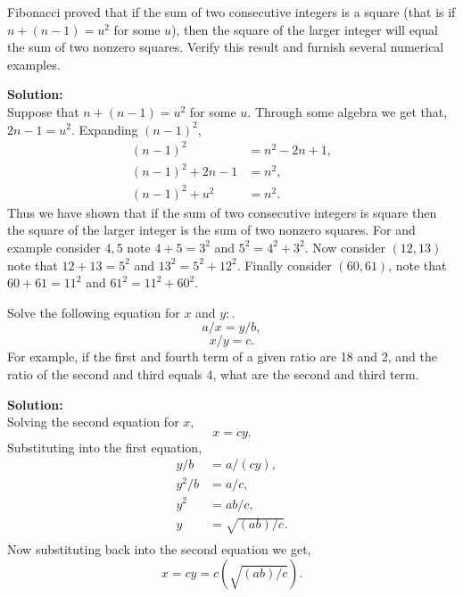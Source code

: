 \documentclass[12pt]{article}
\makeatletter
\theoremstyle{homework}
\newenvironment{exercise}[1]
{\def\@currentlabel{#1}\exercisecore}
{\endexercisecore}
\newcommand{\localhead}[1]{\par\smallskip\noindent\textbf{#1}\nobreak\\}%
\newcommand\solution{\localhead{Solution:}}
\makeatother
\begin{document}
\begin{exercise}{7} Fibonacci proved that if the sum of two consecutive integers is a square (that is if $n + (n-1) = u^2$ for some $u$), 
  then the square of the larger integer will equal the sum of two nonzero squares. Verify this 
  result and furnish several numerical examples.\\
  \solution Suppose that $n + (n-1) = u^2$ for some $u$. Through some algebra we get that, $2n - 1 = u^2$. Expanding $(n-1)^2$,
  \begin{align*}
    (n-1)^2 &= n^2 - 2n + 1,\\
    (n-1)^2 + 2n - 1 &= n^2,\\
    (n-1)^2 + u^2 &= n^2.
  \end{align*}
Thus we have shown that if the sum of two consecutive integers is square then the square of the larger integer is the sum of two nonzero squares. 
For and example consider $4,5$ note $4 + 5 = 3^2$ and $5^2 = 4^2 + 3^2$. Now consider $(12,13)$ note that $12 + 13 = 5^2$ and $13^2 = 5^2 + 12^2$.
Finally consider $(60,61)$, note that $60 + 61 = 11^2$ and $61^2 = 11^2 + 60^2$.
\end{exercise}
\vspace{.5in}



\begin{exercise}{17} Solve the following equation for $x$ and $y:$.
  \begin{equation*}
    a/x = y/b,
  \end{equation*} 
  \begin{equation*}
    x/y = c.
  \end{equation*} 
  For example, if the first and fourth term of a given ratio are 18 and 2, and the ratio of the second and third equals 4, 
  what are the second and third term.\\
  \solution Solving the second equation for $x$,
  \begin{equation*}
    x = cy.
  \end{equation*}
  Substituting into the first equation,
  \begin{align*}
    y/b &= a/(cy),\\
    y^2/b &= a/c,\\
    y^2 &= ab/c,\\
    y &= \sqrt{(ab)/c}.\\
  \end{align*}
  Now substituting back into the second equation we get,
  \begin{equation*}
    x = cy = c(\sqrt{(ab)/c}).
  \end{equation*}
\end{exercise}
\vspace{.5in}
\end{document}
